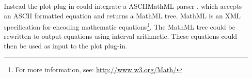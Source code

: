 Instead the plot plug-in could integrate a ASCIIMathML parser \cite{jipsen07}, which accepts an ASCII formatted equation and returns a MathML tree. MathML is an XML specification for encoding mathematic equations\footnote{For more information, see: \url{http://www.w3.org/Math/}}. The MathML tree could be rewritten to output equations using interval arithmetic. These equations could then be used as input to the plot plug-in.
